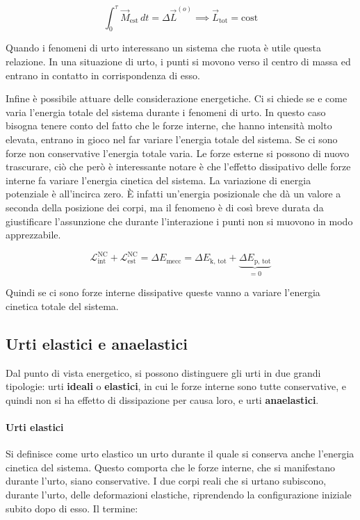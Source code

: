 \[
	\int_0^\tau \vec{M}_\text{est}\,dt=\Delta \vec{L}^{(o)} \implies \vec{L}_\text{tot}=\text{cost}
\]

Quando i fenomeni di urto interessano un sistema che ruota è utile questa relazione. In una situazione di urto, i punti si movono verso il centro di massa ed entrano in contatto in corrispondenza di esso.

Infine è possibile attuare delle considerazione energetiche. Ci si chiede se e come varia l'energia totale del sistema durante i fenomeni di urto. In questo caso bisogna tenere conto del fatto che le forze interne, che hanno intensità molto elevata, entrano in gioco nel far variare l'energia totale del sistema. Se ci sono forze non conservative l'energia totale varia. Le forze esterne si possono di nuovo trascurare, ciò che però è interessante notare è che l'effetto dissipativo delle forze interne fa variare l'energia cinetica del sistema. La variazione di energia potenziale è all'incirca zero. È infatti un'energia posizionale che dà un valore a seconda della posizione dei corpi, ma il fenomeno è di così breve durata da giustificare l'assunzione che durante l'interazione i punti non si muovono in modo apprezzabile.

\[
	\mathcal{L}_\text{int}^\text{NC}+\mathcal{L}_\text{est}^\text{NC}=\Delta E_\text{mecc}=\Delta E_\text{k, tot}+\underbrace{\Delta E_\text{p, tot}}_{=0}
\]

Quindi se ci sono forze interne dissipative queste vanno a variare l'energia cinetica totale del sistema.

\subsection{Urti elastici e anaelastici}

Dal punto di vista energetico, si possono distinguere gli urti in due grandi tipologie: urti \textbf{ideali} o \textbf{elastici}, in cui le forze interne sono tutte conservative, e quindi non si ha effetto di dissipazione per causa loro, e urti \textbf{anaelastici}.

\paragraph{Urti elastici} Si definisce come urto elastico un urto durante il quale si conserva anche l'energia cinetica del sistema. Questo comporta che le forze interne, che si manifestano durante l'urto, siano conservative. I due corpi reali che si urtano subiscono, durante l'urto, delle deformazioni elastiche, riprendendo la configurazione iniziale subito dopo di esso.
Il termine:

